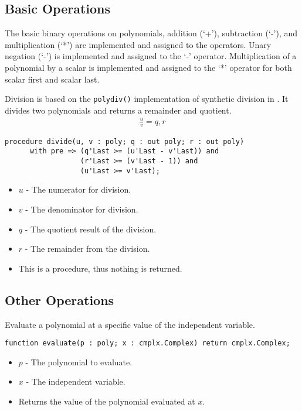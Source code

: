 \documentclass[10pt, openany]{book}
\newcommand{\function}[1]{\texttt{#1}}
\begin{document}
\subsection{Basic Operations}
The basic binary operations on polynomials, addition (`+'), subtraction (`-'), and multiplication (`*') are implemented and assigned to the operators.  Unary negation (`-') is implemented and assigned to the `-' operator.  Multiplication of a polynomial by a scalar is implemented and assigned to the `*' operator for both scalar first and scalar last.

Division is based on the \function{polydiv()} implementation of synthetic division in \cite{NR-C}.  It divides two polynomials and returns a remainder and quotient.
\begin{align*}
  \frac{u}{v} = q, r
\end{align*}
\begin{lstlisting}
procedure divide(u, v : poly; q : out poly; r : out poly)
      with pre => (q'Last >= (u'Last - v'Last)) and
                  (r'Last >= (v'Last - 1)) and
                  (u'Last >= v'Last);
\end{lstlisting}
\begin{itemize}
  \item $u$ - The numerator for division.
  \item $v$ - The denominator for division.
  \item $q$ - The quotient result of the division.
  \item $r$ - The remainder from the division.
  \item This is a procedure, thus nothing is returned.
\end{itemize}

\subsection{Other Operations}

Evaluate a polynomial at a specific value of the independent variable.
\begin{lstlisting}
function evaluate(p : poly; x : cmplx.Complex) return cmplx.Complex;
\end{lstlisting}
\begin{itemize}
  \item $p$ - The polynomial to evaluate.
  \item $x$ - The independent variable.
  \item Returns the value of the polynomial evaluated at $x$.
\end{itemize}
\end{document}
